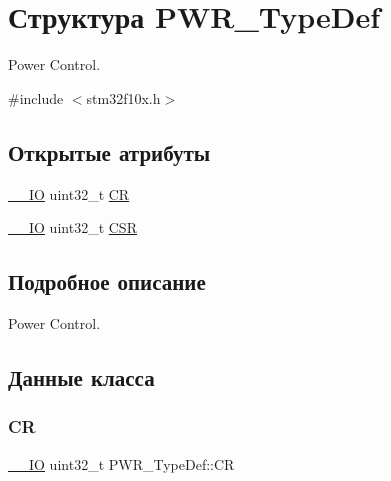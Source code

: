 \hypertarget{struct_p_w_r___type_def}{}\section{Структура P\+W\+R\+\_\+\+Type\+Def}
\label{struct_p_w_r___type_def}


Power Control.  




{\ttfamily \#include $<$stm32f10x.\+h$>$}

\subsection*{Открытые атрибуты}
\begin{DoxyCompactItemize}
\item 
\mbox{\hyperlink{group___c_m_s_i_s___c_m3__core__definitions_gaec43007d9998a0a0e01faede4133d6be}{\+\_\+\+\_\+\+IO}} uint32\+\_\+t \mbox{\hyperlink{struct_p_w_r___type_def_aeb6bcdb2b99d58b9a0ffd86deb606eac}{CR}}
\item 
\mbox{\hyperlink{group___c_m_s_i_s___c_m3__core__definitions_gaec43007d9998a0a0e01faede4133d6be}{\+\_\+\+\_\+\+IO}} uint32\+\_\+t \mbox{\hyperlink{struct_p_w_r___type_def_ae17097e69c88b6c00033d6fb84a8182b}{C\+SR}}
\end{DoxyCompactItemize}


\subsection{Подробное описание}
Power Control. 

\subsection{Данные класса}
\mbox{\label{struct_p_w_r___type_def_aeb6bcdb2b99d58b9a0ffd86deb606eac}} 
\subsubsection{\texorpdfstring{CR}{CR}}
{\footnotesize\ttfamily \mbox{\hyperlink{group___c_m_s_i_s___c_m3__core__definitions_gaec43007d9998a0a0e01faede4133d6be}{\+\_\+\+\_\+\+IO}} uint32\+\_\+t P\+W\+R\+\_\+\+Type\+Def\+::\+CR}

\mbox{\label{struct_p_w_r___type_def_ae17097e69c88b6c00033d6fb84a8182b}} 
